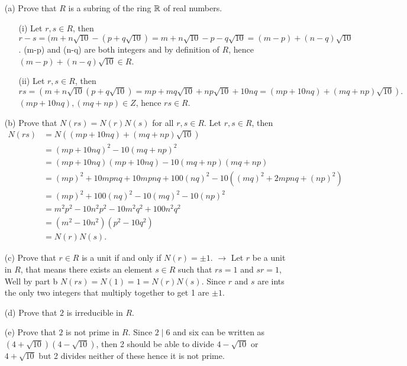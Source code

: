 \documentclass[11pt]{article}
\begin{document}
\proof
{
    \begin{itemize}
        \item[(a)] Prove that \(R\) is a subring of the ring \({\mathbb{R}}\) of real numbers. 
            \begin{itemize}
                \item[(i)] Let \(r,s \in R\), then \(r-s = (m+n\sqrt{10} - (p+q\sqrt{10})= m+n\sqrt{10} - p - q\sqrt{10} = (m-p) + (n-q)\sqrt{10}\). (m-p) and (n-q) are both integers and by definition of \(R\), hence \((m-p) + (n-q)\sqrt{10} \in R\).
                \item[(ii)] Let \(r,s \in R\), then \(rs = (m+n\sqrt{10}(p+q\sqrt{10}) = mp + mq\sqrt{10} + np\sqrt{10} + 10nq = (mp+10nq) + (mq+np)\sqrt{10}).\) \((mp+10nq),(mq+np) \in Z\), hence \(rs \in R\).
            \end{itemize}
        \item[(b)] Prove that \(N(rs)=N(r)N(s)\) for all \(r,s\in R\). 
            Let \(r,s \in R\), then 
            \begin{align*}
                N(rs) &= N((mp+10nq) + (mq+np)\sqrt{10})\\
                &= (mp+10nq)^2 - 10(mq+np)^2\\
                &= (mp+10nq)(mp+10nq) - 10(mq+np)(mq+np)\\
                &= (mp)^2+10mpnq+10mpnq +100(nq)^2- 10((mq)^2+2mpnq+(np)^2)\\
                &= (mp)^2 +100(nq)^2-10(mq)^2-10(np)^2\\ 
                &=  m^2p^2 - 10n^2p^2 - 10m^2q^2 + 100n^2q^2\\
                &= (m^2-10n^2)(p^2-10q^2)\\ 
                &= N(r)N(s).
            \end{align*}
        \item[(c)] Prove that \(r\in R\) is a unit if and only if \(N(r)=\pm 1\). 
        \(\rightarrow\) Let \(r\) be a unit in \(R\), that means there exists an element \(s \in R\) such that \(rs=1\) and \(sr=1\), Well by part b \(N(rs) = N(1) = 1 = N(r)N(s)\). Since \(r\) and \(s\) are ints the only two integers that multiply together to get 1 are \(\pm1\).
        \item[(d)] Prove that \(2\) is irreducible in \(R\). 
        \item[(e)] Prove that \(2\) is not prime in \(R\). Since \(2 \mid 6\) and six can be written as \((4+\sqrt{10})(4-\sqrt{10})\), then 2 should be able to divide \(4-\sqrt{10}\) or \(4+\sqrt{10}\) but 2 divides neither of these hence it is not prime.
    \end{itemize}
}
\end{document}
